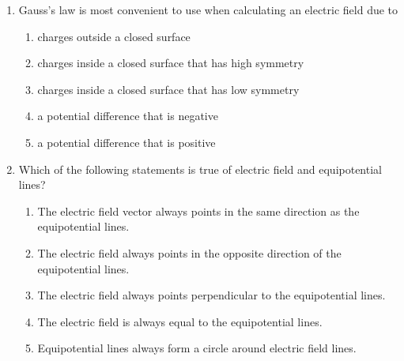 \documentclass[11pt]{article}
\begin{document}
\begin{multicols}{2}
\begin{enumerate}[leftmargin=18pt]
  \item Gauss's law is most convenient to use when calculating an electric field
    due to
    \begin{enumerate}[noitemsep,topsep=0pt,leftmargin=18pt,label=(\Alph*)]
    \item charges outside a closed surface
    \item charges inside a closed surface that has high symmetry
    \item charges inside a closed surface that has low symmetry
    \item a potential difference that is negative
    \item a potential difference that is positive
    \end{enumerate}
    \columnbreak
    
  \item Which of the following statements is true of electric field and
    equipotential lines?
    \begin{enumerate}[noitemsep,topsep=0pt,leftmargin=18pt,label=(\Alph*)]
    \item The electric field vector always points in the same direction as the
      equipotential lines.
    \item The electric field always points in the opposite direction of the
      equipotential lines.
    \item The electric field always points perpendicular to the equipotential
      lines.
    \item The electric field is always equal to the equipotential lines.
    \item Equipotential lines always form a circle around electric field lines.
    \end{enumerate}

    \columnbreak
    \columnbreak
    \begin{center}
    \end{center}


\end{enumerate}
\end{multicols}
\end{document}
